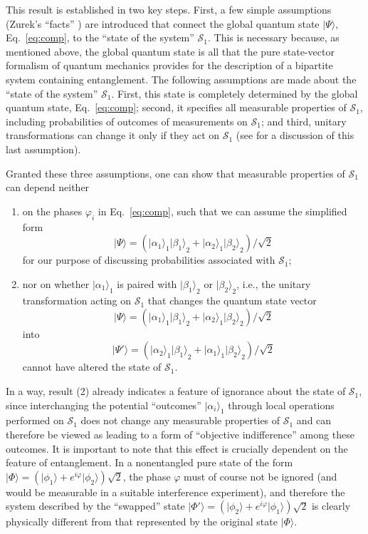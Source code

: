 \documentclass[12pt,aps,floatfix,amsmath,amssymb,showpacs,nofootinbib]{revtex4-2}
\newcommand{\be}{\begin{equation}} \newcommand{\ee}{\end{equation}}
\newcommand{\bn}{\begin{enumerate}} \newcommand{\en}{\end{enumerate}}
\newcommand{\ket}[1]{\ensuremath{|{#1\rangle}}}
\begin{document}
This result is established in two key steps. First, a few simple
assumptions (Zurek's ``facts'' \cite{Zurek:2004:yb}) are introduced
that connect the global quantum state $\ket{\Psi}$,
Eq.~\eqref{eq:comp}, to the ``state of the system'' $\mathcal{S}_1$.
This is necessary because, as mentioned above, the global quantum
state is all that the pure state-vector formalism of quantum mechanics
provides for the description of a bipartite system containing
entanglement.  The following assumptions are made about the ``state of
the system'' $\mathcal{S}_1$. First, this state is completely
determined by the global quantum state, Eq.~\eqref{eq:comp}; second,
it specifies all measurable properties of $\mathcal{S}_1$, including
probabilities of outcomes of measurements on $\mathcal{S}_1$; and
third, unitary transformations can change it only if they act on
$\mathcal{S}_1$ (see \cite{Schlosshauer:2003:ms} for a discussion
of this last assumption).

Granted these three assumptions, one can show that measurable
properties of $\mathcal{S}_1$ can depend neither 

\bn

\item on the phases $\varphi_i$ in Eq.~\eqref{eq:comp}, such that we can
  assume the simplified form
%
\be
\ket{\Psi} = \left( \ket{\alpha_1}_1 \ket{\beta_1}_2
  + \ket{\alpha_2}_1 \ket{\beta_2}_2 \right) / \sqrt{2}
\ee
%
for our purpose of discussing probabilities associated with
$\mathcal{S}_1$;

\item nor on whether $\ket{\alpha_1}_1$ is paired with
  $\ket{\beta_1}_2$ or $\ket{\beta_2}_2$, i.e., the unitary
  transformation acting on $\mathcal{S}_1$ that changes the quantum
  state vector
%
\be
\ket{\Psi} = \left( \ket{\alpha_1}_1 \ket{\beta_1}_2
  + \ket{\alpha_2}_1 \ket{\beta_2}_2 \right) / \sqrt{2}
\ee
%
into
%
\be
\ket{\Psi'} = \left( \ket{\alpha_2}_1 \ket{\beta_1}_2
  + \ket{\alpha_1}_1 \ket{\beta_2}_2 \right) / \sqrt{2}
\ee
%
cannot have altered the state of $\mathcal{S}_1$.

\en

In a way, result (2) already indicates a feature of ignorance about
the state of $\mathcal{S}_1$, since interchanging the potential
``outcomes'' $\ket{\alpha_i}_1$ through local operations performed on
$\mathcal{S}_1$ does not change any measurable properties of
$\mathcal{S}_1$ and can therefore be viewed as leading to a form of
``objective indifference'' among these outcomes. It is important to
note that this effect is crucially dependent on the feature of
entanglement. In a nonentangled pure state of the form $\ket{\Phi} =
\left( \ket{\phi_1} + e^{i\varphi} \ket{\phi_2} \right) \sqrt{2}$, the
phase $\varphi$ must of course not be ignored (and would be measurable
in a suitable interference experiment), and therefore the system
described by the ``swapped'' state $\ket{\Phi'} = \left( \ket{\phi_2}
  + e^{i\varphi} \ket{\phi_1} \right) \sqrt{2}$ is clearly physically
different from that represented by the original state $\ket{\Phi}$.
\end{document}
